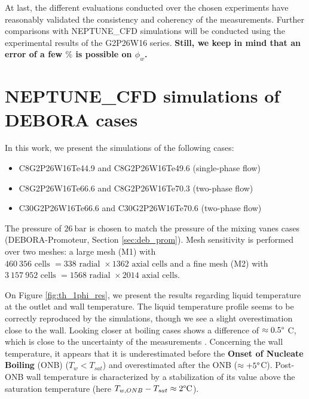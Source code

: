 At last, the different evaluations conducted over the chosen experiments have reasonably validated the consistency and coherency of the measurements. Further comparisons with NEPTUNE\_CFD simulations will be conducted using the experimental results of the G2P26W16 series. \textbf{ Still, we keep in mind that an error of a few $\%$ is possible on $\phi_{w}$.}




\chapter{NEPTUNE\_CFD simulations of DEBORA cases}

In this work, we present the simulations of the following cases:
\begin{itemize}
\item C8G2P26W16Te44.9 and C8G2P26W16Te49.6 (single-phase flow)
\item C8G2P26W16Te66.6 and C8G2P26W16Te70.3 (two-phase flow)
\item C30G2P26W16Te66.6 and C30G2P26W16Te70.6 (two-phase flow)
\end{itemize}

The pressure of $26~\text{bar}$ is chosen to match the pressure of the mixing vanes cases (DEBORA-Promoteur, Section \ref{sec:deb_prom}). Mesh sensitivity is performed over two meshes: a large mesh (M1) with $460~356\text{ cells }=338\text{ radial } \times 1362 \text{ axial cells}$ and a fine mesh (M2) with $3~157~952\text{ cells }=1568\text{ radial } \times 2014 \text{ axial cells}$.

On Figure \ref{fig:th_1phi_res}, we present the results regarding liquid temperature at the outlet and wall temperature. The liquid temperature profile seems to be correctly reproduced by the simulations, though we see a slight overestimation close to the wall. Looking closer at boiling cases shows a difference of $\approx 0.5\degree$ C, which is close to the uncertainty of the measurements \cite{garnier_local_2001}. Concerning the wall temperature, it appears that it is underestimated before the \textbf{Onset of Nucleate Boiling} (ONB) ($T_{w}<T_{sat}$) and overestimated after the ONB ($\approx +5\degree$C). Post-ONB wall temperature is characterized by a stabilization of its value above the saturation temperature (here $T_{w,ONB}-T_{sat}\approx 2\degree\text{C}$).

